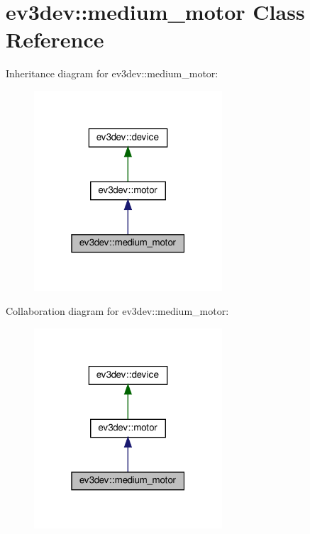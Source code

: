 \hypertarget{classev3dev_1_1medium__motor}{}\section{ev3dev\+:\+:medium\+\_\+motor Class Reference}
\label{classev3dev_1_1medium__motor}


Inheritance diagram for ev3dev\+:\+:medium\+\_\+motor\+:
\nopagebreak
\begin{figure}[H]
\begin{center}
\leavevmode
\includegraphics[width=199pt]{classev3dev_1_1medium__motor__inherit__graph}
\end{center}
\end{figure}


Collaboration diagram for ev3dev\+:\+:medium\+\_\+motor\+:
\nopagebreak
\begin{figure}[H]
\begin{center}
\leavevmode
\includegraphics[width=199pt]{classev3dev_1_1medium__motor__coll__graph}
\end{center}
\end{figure}
